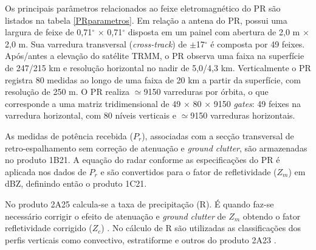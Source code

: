Os principais parâmetros relacionados ao feixe eletromagnético do PR são listados na tabela \ref{PRparametros}. Em relação a antena do PR, possui uma largura de feixe de 0,71$^{\circ}$ $\times$ 0,71$^{\circ}$ disposta em um painel com abertura de 2,0 m $\times$ 2,0 m. Sua varredura transversal (\textit{cross-track}) de $\pm$17$^{\circ}$ é composta por 49 feixes. Após/antes a elevação do satélite TRMM, o PR observa uma faixa na superfície de 247/215 km e resolução horizontal no nadir de 5,0/4,3 km. Verticalmente o PR registra 80 medidas ao longo de uma faixa de 20 km a partir da superfície, com resolução de 250 m. O PR realiza $\simeq$9150 varreduras por órbita, o que corresponde a uma matriz tridimensional de 49 $\times$ 80 $\times$ 9150   \textit{gates}: 49 feixes na varredura horizontal, com 80 níveis verticais e $\simeq$9150 varreduras horizontais.

As medidas de potência recebida ($P_r$), associadas com a secção transversal de retro-espalhamento sem correção de atenuação e  \textit{ground clutter}, são armazenadas no produto 1B21. A equação do radar conforme as especificações do PR é aplicada nos dados de $P_r$ e são convertidos para o fator de refletividade ($Z_m$) em dBZ, definindo então o produto 1C21.


No produto 2A25 calcula-se a taxa de precipitação (R). É quando faz-se necessário corrigir o efeito de atenuação e \textit{ground clutter} de $Z_m$ obtendo o fator refletividade corrigido ($Z_c$) \cite{iguchi1994atenua,meneghini2000,iguchi2000rain}. No cálculo de R são utilizadas as classificações dos perfis verticais como convectivo, estratiforme e outros do produto 2A23 \cite{awaka1997}. 

